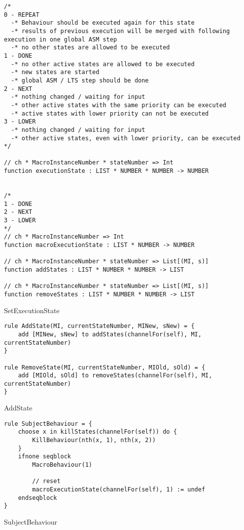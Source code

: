 \begin{listing}[H]
\begin{verbatim}
/*
0 - REPEAT
  -* Behaviour should be executed again for this state
  -* results of previous execution will be merged with following execution in one global ASM step
  -* no other states are allowed to be executed
1 - DONE
  -* no other active states are allowed to be executed
  -* new states are started
  -* global ASM / LTS step should be done
2 - NEXT
  -* nothing changed / waiting for input
  -* other active states with the same priority can be executed
  -* active states with lower priority can not be executed
3 - LOWER
  -* nothing changed / waiting for input
  -* other active states, even with lower priority, can be executed
*/

// ch * MacroInstanceNumber * stateNumber => Int
function executionState : LIST * NUMBER * NUMBER -> NUMBER


/*
1 - DONE
2 - NEXT
3 - LOWER
*/
// ch * MacroInstanceNumber => Int
function macroExecutionState : LIST * NUMBER -> NUMBER

// ch * MacroInstanceNumber * stateNumber => List[(MI, s)]
function addStates : LIST * NUMBER * NUMBER -> LIST

// ch * MacroInstanceNumber * stateNumber => List[(MI, s)]
function removeStates : LIST * NUMBER * NUMBER -> LIST
\end{verbatim}
\caption{SetExecutionState}
\label{lst:asm:SetExecutionState}
\end{listing}




\begin{listing}[H]
\begin{verbatim}
rule AddState(MI, currentStateNumber, MINew, sNew) = {
    add [MINew, sNew] to addStates(channelFor(self), MI, currentStateNumber)
}

rule RemoveState(MI, currentStateNumber, MIOld, sOld) = {
    add [MIOld, sOld] to removeStates(channelFor(self), MI, currentStateNumber)
}
\end{verbatim}
\caption{AddState}
\label{lst:asm:AddState}
\end{listing}







\begin{listing}[H]
\begin{verbatim}
rule SubjectBehaviour = {
    choose x in killStates(channelFor(self)) do {
        KillBehaviour(nth(x, 1), nth(x, 2))
    }
    ifnone seqblock
        MacroBehaviour(1)

        // reset
        macroExecutionState(channelFor(self), 1) := undef
    endseqblock
}
\end{verbatim}
\caption{SubjectBehaviour}
\label{lst:asm:SubjectBehaviour}
\end{listing}





